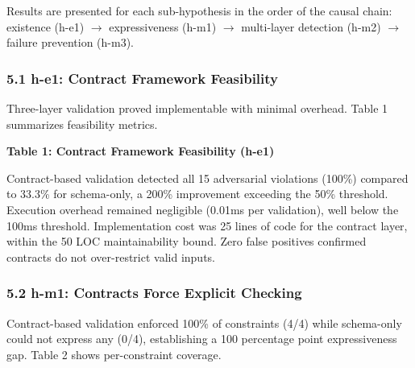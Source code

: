 
Results are presented for each sub-hypothesis in the order of the causal chain: existence (h-e1) $\rightarrow$ expressiveness (h-m1) $\rightarrow$ multi-layer detection (h-m2) $\rightarrow$ failure prevention (h-m3).

\subsubsection{5.1 h-e1: Contract Framework Feasibility}

Three-layer validation proved implementable with minimal overhead. Table 1 summarizes feasibility metrics.

\textbf{Table 1: Contract Framework Feasibility (h-e1)}

\begin{table}[htbp]
\centering
{}
\end{table}

Contract-based validation detected all 15 adversarial violations (100\%) compared to 33.3\% for schema-only, a 200\% improvement exceeding the 50\% threshold. Execution overhead remained negligible (0.01ms per validation), well below the 100ms threshold. Implementation cost was 25 lines of code for the contract layer, within the 50 LOC maintainability bound. Zero false positives confirmed contracts do not over-restrict valid inputs.

\subsubsection{5.2 h-m1: Contracts Force Explicit Checking}

Contract-based validation enforced 100\% of constraints (4/4) while schema-only could not express any (0/4), establishing a 100 percentage point expressiveness gap. Table 2 shows per-constraint coverage.

